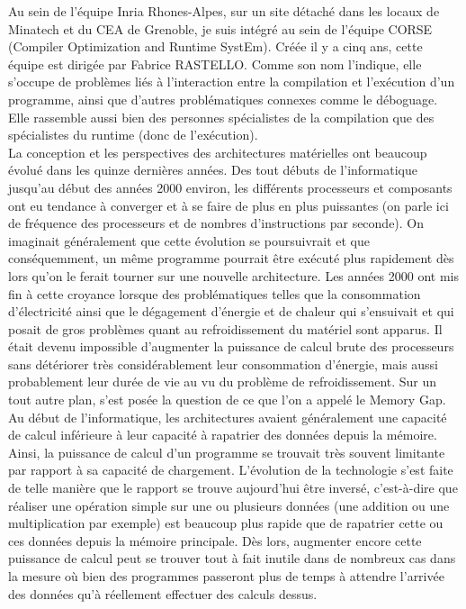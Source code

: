 \documentclass{report}
\begin{document}
Au sein de l'équipe Inria Rhones-Alpes, sur un site détaché dans les locaux de Minatech 
et du CEA de Grenoble, je suis intégré au sein de l'équipe CORSE (Compiler Optimization 
and Runtime SystEm). Créée il y a cinq ans, cette équipe est dirigée par Fabrice RASTELLO.
Comme son nom l'indique, elle s'occupe de problèmes liés à l'interaction entre la compilation
et l'exécution d'un programme, ainsi que d'autres problématiques connexes comme le déboguage.
Elle rassemble aussi bien des personnes spécialistes de la compilation que des spécialistes 
du runtime (donc de l'exécution).
\\ La conception et les perspectives des architectures matérielles ont beaucoup évolué dans les 
quinze dernières années.  Des tout débuts de l'informatique jusqu'au début des années 2000 
environ, les différents processeurs et composants ont eu tendance à converger et à se faire de
plus en plus puissantes (on parle ici de fréquence des processeurs et de nombres d'instructions 
par seconde). On imaginait généralement que cette évolution se poursuivrait et que conséquemment, 
un même programme pourrait être exécuté plus rapidement dès lors qu'on le ferait tourner sur une 
nouvelle architecture. Les années 2000 ont mis fin à cette croyance lorsque des problématiques 
telles que la consommation d'électricité ainsi que le dégagement d'énergie et de chaleur qui 
s'ensuivait et qui posait de gros problèmes quant au refroidissement du matériel sont apparus. Il 
était devenu impossible d'augmenter la puissance de calcul brute des processeurs sans détériorer 
très considérablement leur consommation d'énergie, mais aussi probablement leur durée de vie au vu du 
problème de refroidissement. Sur un tout autre plan, s'est posée la question de ce que l'on a 
appelé le Memory Gap.  Au début de l'informatique, les architectures avaient généralement une capacité
de calcul inférieure à leur capacité à rapatrier des données depuis la mémoire. Ainsi, la puissance de
calcul d'un programme se trouvait très souvent limitante par rapport à sa capacité de chargement. 
L'évolution de la technologie s'est faite de telle manière que le rapport se trouve aujourd'hui 
être inversé, c'est-à-dire que réaliser une opération simple sur une ou plusieurs données (une addition
ou une multiplication par exemple) est beaucoup plus rapide que de rapatrier cette ou ces données depuis
la mémoire principale. Dès lors, augmenter encore cette puissance de calcul peut se trouver tout à 
fait inutile dans de nombreux cas dans la mesure où bien des programmes passeront plus de temps à 
attendre l'arrivée des données qu'à réellement effectuer des calculs dessus. 
\end{document}
